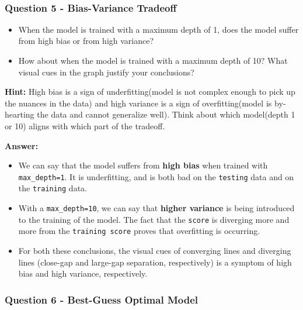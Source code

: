 \documentclass[11pt]{article}
\providecommand{\tightlist}{%
      \setlength{\itemsep}{0pt}\setlength{\parskip}{0pt}}
\begin{document}
    \begin{center}
    \end{center}
    { \hspace*{\fill} \\}
    
    \subsubsection{Question 5 - Bias-Variance
Tradeoff}\label{question-5---bias-variance-tradeoff}

\begin{itemize}
\tightlist
\item
  When the model is trained with a maximum depth of 1, does the model
  suffer from high bias or from high variance?
\item
  How about when the model is trained with a maximum depth of 10? What
  visual cues in the graph justify your conclusions?
\end{itemize}

\textbf{Hint:} High bias is a sign of underfitting(model is not complex
enough to pick up the nuances in the data) and high variance is a sign
of overfitting(model is by-hearting the data and cannot generalize
well). Think about which model(depth 1 or 10) aligns with which part of
the tradeoff.

    \textbf{Answer: }

\begin{itemize}
\tightlist
\item
  We can say that the model suffers from \textbf{high bias} when trained
  with \texttt{max\_depth=1}. It is underfitting, and is both bad on the
  \texttt{testing} data and on the \texttt{training} data.
\item
  With a \texttt{max\_depth=10}, we can say that \textbf{higher
  variance} is being introduced to the training of the model. The fact
  that the \texttt{score} is diverging more and more from the
  \texttt{training\ score} proves that overfitting is occurring.
\item
  For both these conclusions, the visual cues of converging lines and
  diverging lines (close-gap and large-gap separation, respectively) is
  a symptom of high bias and high variance, respectively.
\end{itemize}

    \subsubsection{Question 6 - Best-Guess Optimal
Model}\label{question-6---best-guess-optimal-model}
\end{document}
